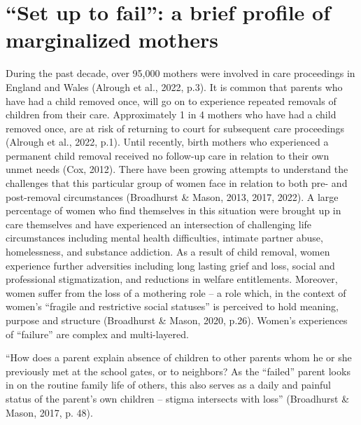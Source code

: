 \documentclass[authordate, empirical]{jote-new-article}
\author[1]{\mbox{Afra Jurkiewicz\orcid{0009-0004-6138-8392}}}
\affil[1]{Nordoff Robbins}
\begin{document}
\begin{frontmatter}
  \maketitle
  \begin{abstract}
    \printabstracttext
  \end{abstract}
\end{frontmatter}


\section{“Set up to fail”: a brief profile of marginalized mothers}







During the past decade, over 95,000 mothers were involved in care proceedings in England and Wales (Alrough et al., 2022, p.3). It is common that parents who have had a child removed once, will go on to experience repeated removals of children from their care. Approximately 1 in 4 mothers who have had a child removed once, are at risk of returning to court for subsequent care proceedings (Alrough et al., 2022, p.1). Until recently, birth mothers who experienced a permanent child removal received no follow-up care in relation to their own unmet needs (Cox, 2012). There have been growing attempts to understand the challenges that this particular group of women face in relation to both pre- and post-removal circumstances (Broadhurst \& Mason, 2013, 2017, 2022). A large percentage of women who find themselves in this situation were brought up in care themselves and have experienced an intersection of challenging life circumstances including mental health difficulties, intimate partner abuse, homelessness, and substance addiction. As a result of child removal, women experience further adversities including long lasting grief and loss, social and professional stigmatization, and reductions in welfare entitlements. Moreover, women suffer from the loss of a mothering role -- a role which, in the context of women's “fragile and restrictive social statuses” is perceived to hold meaning, purpose and structure (Broadhurst \& Mason, 2020, p.26). Women's experiences of “failure” are complex and multi-layered.







“How does a parent explain absence of children to other parents whom he or she previously met at the school gates, or to neighbors? As the “failed” parent looks in on the routine family life of others, this also serves as a daily and painful status of the parent's own children -- stigma intersects with loss” (Broadhurst \& Mason, 2017, p. 48).
\end{document}
